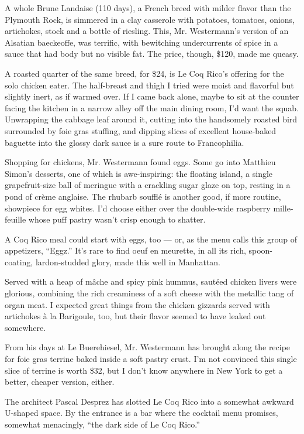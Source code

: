 A whole Brune Landaise (110 days), a French breed with milder flavor
than the Plymouth Rock, is simmered in a clay casserole with potatoes,
tomatoes, onions, artichokes, stock and a bottle of riesling. This, Mr.
Westermann's version of an Alsatian baeckeoffe, was terrific, with
bewitching undercurrents of spice in a sauce that had body but no
visible fat. The price, though, \$120, made me queasy.

A roasted quarter of the same breed, for \$24, is Le Coq Rico's offering
for the solo chicken eater. The half-breast and thigh I tried were moist
and flavorful but slightly inert, as if warmed over. If I came back
alone, maybe to sit at the counter facing the kitchen in a narrow alley
off the main dining room, I'd want the squab. Unwrapping the cabbage
leaf around it, cutting into the handsomely roasted bird surrounded by
foie gras stuffing, and dipping slices of excellent house-baked baguette
into the glossy dark sauce is a sure route to Francophilia.

Shopping for chickens, Mr. Westermann found eggs. Some go into Matthieu
Simon's desserts, one of which is awe-inspiring: the floating island, a
single grapefruit-size ball of meringue with a crackling sugar glaze on
top, resting in a pond of crème anglaise. The rhubarb soufflé is another
good, if more routine, showpiece for egg whites. I'd choose either over
the double-wide raspberry mille-feuille whose puff pastry wasn't crisp
enough to shatter.

A Coq Rico meal could start with eggs, too --- or, as the menu calls
this group of appetizers, ``Eggz.'' It's rare to find oeuf en meurette,
in all its rich, spoon-coating, lardon-studded glory, made this well in
Manhattan.

Served with a heap of mâche and spicy pink hummus, sautéed chicken
livers were glorious, combining the rich creaminess of a soft cheese
with the metallic tang of organ meat. I expected great things from the
chicken gizzards served with artichokes à la Barigoule, too, but their
flavor seemed to have leaked out somewhere.

From his days at Le Buerehiesel, Mr. Westermann has brought along the
recipe for foie gras terrine baked inside a soft pastry crust. I'm not
convinced this single slice of terrine is worth \$32, but I don't know
anywhere in New York to get a better, cheaper version, either.

The architect Pascal Desprez has slotted Le Coq Rico into a somewhat
awkward U-shaped space. By the entrance is a bar where the cocktail menu
promises, somewhat menacingly, ``the dark side of Le Coq Rico.''


